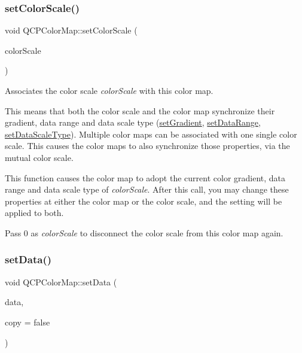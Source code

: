 \mbox{\label{class_q_c_p_color_map_aa828921db364fe3c6af4619580ab85fd}} 
\subsubsection{\texorpdfstring{set\+Color\+Scale()}{setColorScale()}}
{\footnotesize\ttfamily void Q\+C\+P\+Color\+Map\+::set\+Color\+Scale (\begin{DoxyParamCaption}\item[{\hyperlink{class_q_c_p_color_scale}{Q\+C\+P\+Color\+Scale} $\ast$}]{color\+Scale }\end{DoxyParamCaption})}

Associates the color scale {\itshape color\+Scale} with this color map.

This means that both the color scale and the color map synchronize their gradient, data range and data scale type (\hyperlink{class_q_c_p_color_map_a7313c78360471cead3576341a2c50377}{set\+Gradient}, \hyperlink{class_q_c_p_color_map_a980b42837821159786a85b4b7dcb8774}{set\+Data\+Range}, \hyperlink{class_q_c_p_color_map_a9d20aa08e3c1f20f22908c45b9c06511}{set\+Data\+Scale\+Type}). Multiple color maps can be associated with one single color scale. This causes the color maps to also synchronize those properties, via the mutual color scale.

This function causes the color map to adopt the current color gradient, data range and data scale type of {\itshape color\+Scale}. After this call, you may change these properties at either the color map or the color scale, and the setting will be applied to both.

Pass 0 as {\itshape color\+Scale} to disconnect the color scale from this color map again. \mbox{\label{class_q_c_p_color_map_a5a23e133a20c4ccad35fd32e6c0f9809}} 
\subsubsection{\texorpdfstring{set\+Data()}{setData()}}
{\footnotesize\ttfamily void Q\+C\+P\+Color\+Map\+::set\+Data (\begin{DoxyParamCaption}\item[{\hyperlink{class_q_c_p_color_map_data}{Q\+C\+P\+Color\+Map\+Data} $\ast$}]{data,  }\item[{bool}]{copy = {\ttfamily false} }\end{DoxyParamCaption})}


